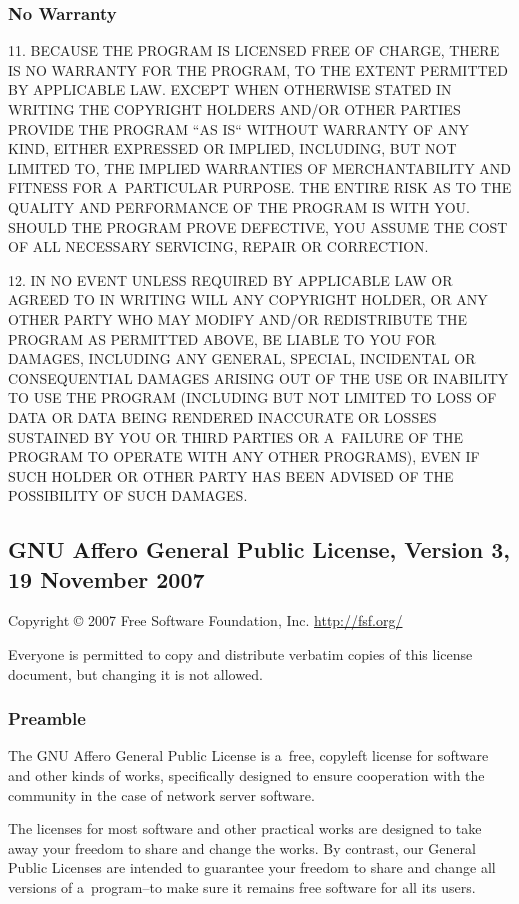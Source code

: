 \documentclass[a4paper, 11pt, twoside]{article}
\begin{document}
\subsubsection{No Warranty}

11. BECAUSE THE PROGRAM IS LICENSED FREE OF CHARGE, THERE IS NO WARRANTY FOR THE PROGRAM, TO THE EXTENT PERMITTED BY APPLICABLE LAW. EXCEPT WHEN OTHERWISE STATED IN WRITING THE COPYRIGHT HOLDERS AND/OR OTHER PARTIES PROVIDE THE PROGRAM “AS IS“ WITHOUT WARRANTY OF ANY KIND, EITHER EXPRESSED OR IMPLIED, INCLUDING, BUT NOT LIMITED TO, THE IMPLIED WARRANTIES OF MERCHANTABILITY AND FITNESS FOR A~PARTICULAR PURPOSE. THE ENTIRE RISK AS TO THE QUALITY AND PERFORMANCE OF THE PROGRAM IS WITH YOU. SHOULD THE PROGRAM PROVE DEFECTIVE, YOU ASSUME THE COST OF ALL NECESSARY SERVICING, REPAIR OR CORRECTION.

12. IN NO EVENT UNLESS REQUIRED BY APPLICABLE LAW OR AGREED TO IN WRITING WILL ANY COPYRIGHT HOLDER, OR ANY OTHER PARTY WHO MAY MODIFY AND/OR REDISTRIBUTE THE PROGRAM AS PERMITTED ABOVE, BE LIABLE TO YOU FOR DAMAGES, INCLUDING ANY GENERAL, SPECIAL, INCIDENTAL OR CONSEQUENTIAL DAMAGES ARISING OUT OF THE USE OR INABILITY TO USE THE PROGRAM (INCLUDING BUT NOT LIMITED TO LOSS OF DATA OR DATA BEING RENDERED INACCURATE OR LOSSES SUSTAINED BY YOU OR THIRD PARTIES OR A~FAILURE OF THE PROGRAM TO OPERATE WITH ANY OTHER PROGRAMS), EVEN IF SUCH HOLDER OR OTHER PARTY HAS BEEN ADVISED OF THE POSSIBILITY OF SUCH DAMAGES.

\subsection{GNU Affero General Public License, Version 3, 19 November 2007}

Copyright © 2007 Free Software Foundation, Inc. \url{http://fsf.org/}

Everyone is permitted to copy and distribute verbatim copies of this license document, but changing it is not allowed.

\subsubsection{Preamble}

The GNU Affero General Public License is a~free, copyleft license for software and other kinds of works, specifically designed to ensure cooperation with the community in the case of network server software.

The licenses for most software and other practical works are designed to take away your freedom to share and change the works. By contrast, our General Public Licenses are intended to guarantee your freedom to share and change all versions of a~program--to make sure it remains free software for all its users.
\end{document}
